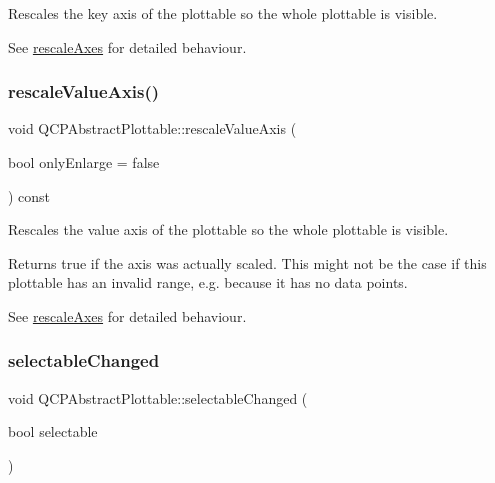 Rescales the key axis of the plottable so the whole plottable is visible.

See \mbox{\hyperlink{class_q_c_p_abstract_plottable_a1491c4a606bccd2d09e65e11b79eb882}{rescale\+Axes}} for detailed behaviour. \mbox{\label{class_q_c_p_abstract_plottable_aa1e408bb2d13999150c3f7f8a8579ca9}} 
\subsubsection{\texorpdfstring{rescale\+Value\+Axis()}{rescaleValueAxis()}}
{\footnotesize\ttfamily void Q\+C\+P\+Abstract\+Plottable\+::rescale\+Value\+Axis (\begin{DoxyParamCaption}\item[{bool}]{only\+Enlarge = {\ttfamily false} }\end{DoxyParamCaption}) const}

Rescales the value axis of the plottable so the whole plottable is visible.

Returns true if the axis was actually scaled. This might not be the case if this plottable has an invalid range, e.\+g. because it has no data points.

See \mbox{\hyperlink{class_q_c_p_abstract_plottable_a1491c4a606bccd2d09e65e11b79eb882}{rescale\+Axes}} for detailed behaviour. \mbox{\label{class_q_c_p_abstract_plottable_a0059caa3f3581f3959660fef8cbb71c4}} 
\subsubsection{\texorpdfstring{selectable\+Changed}{selectableChanged}}
{\footnotesize\ttfamily void Q\+C\+P\+Abstract\+Plottable\+::selectable\+Changed (\begin{DoxyParamCaption}\item[{bool}]{selectable }\end{DoxyParamCaption})\hspace{0.3cm}{\ttfamily [signal]}}

